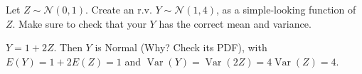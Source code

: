 

\setcounter{theorem}{18}
\begin{exercise}[BH.5.19] Let $Z \sim \mathcal{N}(0,1)$. Create an r.v. $Y \sim \mathcal{N}(1,4)$, as a simple-looking function of $Z$. Make sure to check that your $Y$ has the correct mean and variance.
\begin{solution} 
    $Y=1+2 Z$. Then $Y$ is Normal (Why? Check its PDF), with $E(Y)=1+2 E(Z)=1$ and $\operatorname{Var}(Y)=\operatorname{Var}(2 Z)=4 \operatorname{Var}(Z)=4$.
\end{solution}
\end{exercise}



